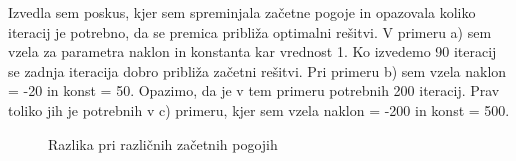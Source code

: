 \documentclass{article}
\begin{document}
\noindent Izvedla sem poskus, kjer sem spreminjala začetne pogoje in opazovala koliko iteracij je potrebno, da se premica približa optimalni rešitvi. V primeru a) sem vzela za parametra naklon in konstanta kar vrednost 1. Ko izvedemo 90 iteracij se zadnja iteracija dobro približa začetni rešitvi. Pri primeru b) sem vzela naklon = -20 in konst = 50. Opazimo, da je v tem primeru potrebnih 200 iteracij. Prav toliko jih je potrebnih v c) primeru, kjer sem vzela naklon = -200 in konst = 500. 

\begin{figure}
    \centering
    \caption{Razlika pri različnih začetnih pogojih}
    \label{fig:foobar}
\end{figure}
\end{document}
